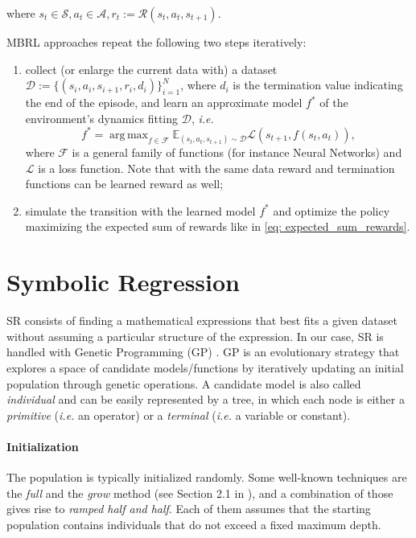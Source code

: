 \documentclass[11pt]{article}
\DeclareMathOperator*{\argmax}{arg\,max}
\begin{document}
where $s_t \in \mathcal{S}, a_t \in \mathcal{A}, r_t := \mathcal{R}(s_t, a_t, s_{t+1})$.

MBRL approaches repeat the following two steps iteratively:
\begin{enumerate}
	\item collect (or enlarge the current data with) a dataset $\mathcal{D} := \{(s_i, a_i, s_{i+1}, r_i, d_i)\}_{i=1}^N$, where $d_i$ is the termination value indicating the end of the episode, and learn an approximate model $f^*$ of the environment's dynamics fitting $\mathcal{D}$, \textsl{i.e.}
	\begin{equation}
		f^* = \argmax_{f \in \mathcal{F}} \mathbb{E}_{(s_t, a_t, s_{t+1}) \sim \mathcal{D}} \mathcal{L}(s_{t+1}, f(s_t, a_t)),
	\end{equation}
	where $\mathcal{F}$ is a general family of functions (for instance Neural Networks) and $\mathcal{L}$ is a loss function. Note that with the same data reward and termination functions can be learned reward as well;
	\item simulate the transition with the learned model $f^*$ and optimize the policy maximizing the expected sum of rewards like in \eqref{eq: expected_sum_rewards}.
\end{enumerate}

\section{Symbolic Regression}
SR consists of finding a mathematical expressions that best fits a given dataset without assuming a particular structure of the expression. 
In our case, SR is handled with Genetic Programming (GP) \cite{koza1994genetic, o2009riccardo}. GP is an evolutionary strategy that explores a space of candidate models/functions by iteratively updating an initial population through genetic operations. A candidate model is also called \textsl{individual} and can be easily represented by a tree, in which each node is either a \textsl{primitive} (\textsl{i.e.} an operator) or a \textsl{terminal} (\textsl{i.e.} a variable or constant).
\paragraph{Initialization} The population is typically initialized randomly. Some well-known techniques are the \textsl{full} and the \textsl{grow} method (see Section 2.1 in \cite{o2009riccardo}), and a combination of those gives rise to \textsl{ramped half and half}. Each of them assumes that the starting population contains individuals that do not exceed a fixed maximum depth.
\end{document}
